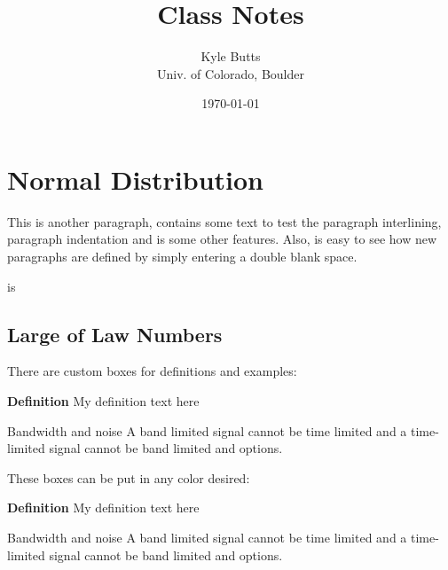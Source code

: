 \documentclass[11pt]{article}
\title{Class Notes}
\author{\normalsize Kyle Butts\\{\footnotesize Univ. of Colorado, Boulder}}
\date{\footnotesize\today}
\begin{document}
\maketitle





\section{Normal Distribution}

This is another paragraph, contains some text to test the paragraph
interlining, paragraph indentation and  is some other features. Also, is easy to see how new paragraphs are defined by simply entering a 
double blank space.

 is 





\subsection{Large of Law Numbers}


There are custom boxes for definitions and examples:

\begin{def_box}[accent]
    \textbf{Definition} My definition text here
\end{def_box}

\begin{example_box}[accent]{Bandwidth and noise}
    A band limited signal cannot be time limited and a time-limited signal cannot be band limited and options.
\end{example_box}

These boxes can be put in any color desired:

\begin{def_box}
    \textbf{Definition} My definition text here
\end{def_box}

\begin{example_box}{Bandwidth and noise}
    A band limited signal cannot be time limited and a time-limited signal cannot be band limited and options.
\end{example_box}
\end{document}
